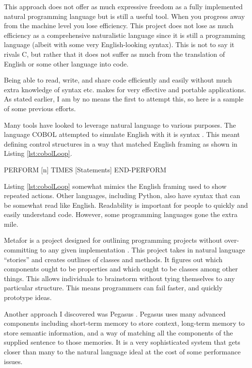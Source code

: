 \documentclass[titlepage]{article}
\newcommand{\lstRef}[1]{Listing \ref{lst:#1}}
\begin{document}
This approach does not offer as much expressive freedom as a fully implemented natural programming language but is still a useful tool. When you progress away from the machine level you lose efficiency. This project does not lose as much efficiency as a comprehensive naturalistic language since it is still a programming language (albeit with some very English-looking syntax). This is not to say it rivals C, but rather that it does not suffer as much from the translation of English or some other language into code.

Being able to read, write, and share code efficiently and easily without much extra knowledge of syntax etc. makes for very effective and portable applications. As stated earlier, I am by no means the first to attempt this, so here is a sample of some previous efforts.

Many tools have looked to leverage natural language to various purposes. The language COBOL attempted to simulate English with it is syntax \cite{Liu2005MetaforVS}. This meant defining control structures in a way that matched English framing as shown in \lstRef{cobolLoop}.

\begin{codeblock}[language=Cobol,caption={Cobol Loop Frame},label={lst:cobolLoop}]
	PERFORM [n] TIMES
		[Statements]
	END-PERFORM
\end{codeblock}

\lstRef{cobolLoop} somewhat mimics the English framing used to show repeated actions. Other languages, including Python, also have syntax that can be somewhat read like English. Readability is important for people to quickly and easily understand code. However, some programming languages gone the extra mile.

Metafor is a project designed for outlining programming projects without over-committing to any given implementation \cite{Liu2005MetaforVS}. This project takes in natural language “stories” and creates outlines of classes and methods. It figures out which components ought to be properties and which ought to be classes among other things. This allows individuals to brainstorm without tying themselves to any particular structure. This means programmers can fail faster, and quickly prototype ideas.

Another approach I discovered was Pegasus \cite{Knöll2006PegasusFS}. Pegasus uses many advanced components including short-term memory to store context, long-term memory to store semantic information, and a way of matching all the components of the supplied sentence to those memories. It is a very sophisticated system that gets closer than many to the natural language ideal at the cost of some performance issues.
\end{document}
